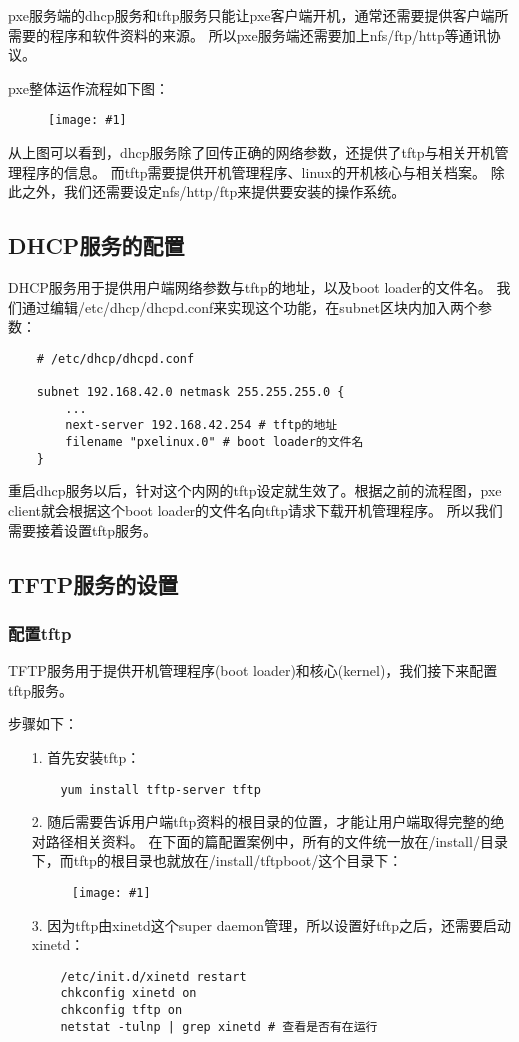 \documentclass[a4paper,left=2.5cm,right=2.5cm,11pt]{article}
\newcommand{\fic}[1]{\begin{figure}[H]
		\center
		\texttt{[image: \#1]}
	\end{figure}}
\begin{document}
	pxe服务端的dhcp服务和tftp服务只能让pxe客户端开机，通常还需要提供客户端所需要的程序和软件资料的来源。
	所以pxe服务端还需要加上nfs/ftp/http等通讯协议。\par

	pxe整体运作流程如下图：
	\fic{1.jpg}

	从上图可以看到，dhcp服务除了回传正确的网络参数，还提供了tftp与相关开机管理程序的信息。
	而tftp需要提供开机管理程序、linux的开机核心与相关档案。
	除此之外，我们还需要设定nfs/http/ftp来提供要安装的操作系统。

\subsection{DHCP服务的配置}
	DHCP服务用于提供用户端网络参数与tftp的地址，以及boot loader的文件名。
	我们通过编辑/etc/dhcp/dhcpd.conf来实现这个功能，在subnet区块内加入两个参数：
	\begin{lstlisting}
	# /etc/dhcp/dhcpd.conf

	subnet 192.168.42.0 netmask 255.255.255.0 {
		...
		next-server 192.168.42.254 # tftp的地址
		filename "pxelinux.0" # boot loader的文件名
	}
	\end{lstlisting}

	重启dhcp服务以后，针对这个内网的tftp设定就生效了。根据之前的流程图，pxe client就会根据这个boot loader的文件名向tftp请求下载开机管理程序。
	所以我们需要接着设置tftp服务。

\subsection{TFTP服务的设置}
\subsubsection{配置tftp}
	TFTP服务用于提供开机管理程序(boot loader)和核心(kernel)，我们接下来配置tftp服务。\par

	步骤如下：
	\begin{itemize}
		\item[1.] 首先安装tftp：
		\begin{lstlisting}
	yum install tftp-server tftp
		\end{lstlisting}

		\item[2.] 随后需要告诉用户端tftp资料的根目录的位置，才能让用户端取得完整的绝对路径相关资料。
				  在下面的篇配置案例中，所有的文件统一放在/install/目录下，而tftp的根目录也就放在/install/tftpboot/这个目录下：
				  \fic{2.png}

		\item[3.] 因为tftp由xinetd这个super daemon管理，所以设置好tftp之后，还需要启动xinetd：
		\begin{lstlisting}
	/etc/init.d/xinetd restart
	chkconfig xinetd on
	chkconfig tftp on
	netstat -tulnp | grep xinetd # 查看是否有在运行
		\end{lstlisting}
	\end{itemize}
\end{document}
